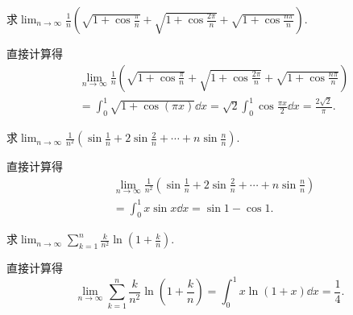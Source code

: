 \begin{example}
求\(\lim_{n\to\infty} \frac1n \left(
	\sqrt{1+\cos\frac\pi{n}}
	+ \sqrt{1+\cos\frac{2\pi}{n}}
	+ \sqrt{1+\cos\frac{n\pi}{n}}
\right)\).
\begin{solution}
直接计算得\begin{align*}
	&\lim_{n\to\infty} \frac1n \left(
		\sqrt{1+\cos\frac\pi{n}}
		+ \sqrt{1+\cos\frac{2\pi}{n}}
		+ \sqrt{1+\cos\frac{n\pi}{n}}
	\right) \\
	&= \int_0^1 \sqrt{1+\cos(\pi x)} \dd{x}
	= \sqrt2 \int_0^1 \cos\frac{\pi x}2 \dd{x}
	= \frac{2\sqrt2}\pi.
\end{align*}
\end{solution}
\end{example}
\begin{example}
求\(\lim_{n\to\infty} \frac1{n^2} \left( \sin\frac1n + 2\sin\frac2n + \dotsb + n\sin\frac{n}{n} \right)\).
\begin{solution}
直接计算得\begin{align*}
	&\lim_{n\to\infty} \frac1{n^2} \left( \sin\frac1n + 2\sin\frac2n + \dotsb + n\sin\frac{n}{n} \right) \\
	&= \int_0^1 x \sin x \dd{x}
	= \sin1 - \cos1.
\end{align*}
\end{solution}
\end{example}
\begin{example}
求\(\lim_{n\to\infty} \sum_{k=1}^n \frac{k}{n^2} \ln(1+\frac{k}{n})\).
\begin{solution}
直接计算得\begin{equation*}
	\lim_{n\to\infty} \sum_{k=1}^n \frac{k}{n^2} \ln(1+\frac{k}{n})
	= \int_0^1 x \ln(1+x) \dd{x}
	= \frac14.
\end{equation*}
\end{solution}
\end{example}

